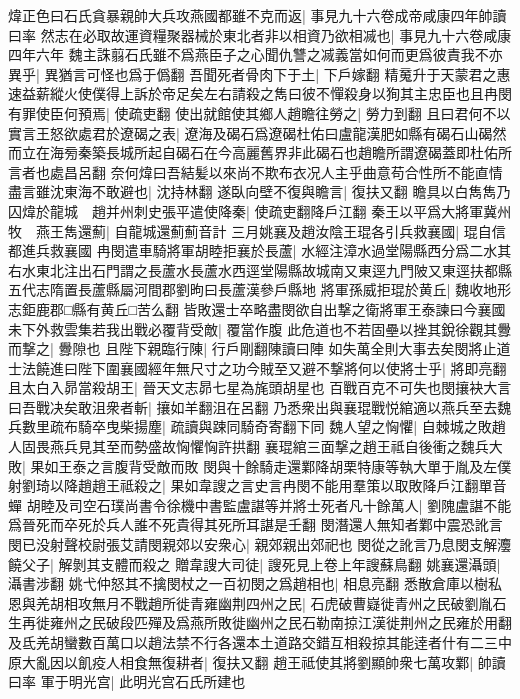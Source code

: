 煒正色曰石氏貪暴親帥大兵攻燕國都雖不克而返|{
	事見九十六卷成帝咸康四年帥讀曰率}
然志在必取故運資糧聚器械於東北者非以相資乃欲相㓕也|{
	事見九十六卷咸康四年六年}
魏主誅翦石氏雖不爲燕臣子之心聞仇讐之㓕義當如何而更爲彼責我不亦異乎|{
	異猶言可怪也爲于僞翻}
吾聞死者骨肉下于土|{
	下戶嫁翻}
精䰟升于天蒙君之惠速益薪縱火使僕得上訴於帝足矣左右請殺之雋曰彼不憚殺身以狥其主忠臣也且冉閔有罪使臣何預焉|{
	使疏吏翻}
使出就館使其鄉人趙瞻往勞之|{
	勞力到翻}
且曰君何不以實言王怒欲處君於遼碣之表|{
	遼海及碣石爲遼碣杜佑曰盧龍漢肥如縣有碣石山碣然而立在海㫄秦築長城所起自碣石在今高麗舊界非此碣石也趙瞻所謂遼碣蓋即杜佑所言者也處昌呂翻}
奈何煒曰吾結髪以來尚不欺布衣况人主乎曲意苟合性所不能直情盡言雖沈東海不敢避也|{
	沈持林翻}
遂臥向壁不復與瞻言|{
	復扶又翻}
瞻具以白雋雋乃囚煒於龍城　趙并州刺史張平遣使降秦|{
	使疏吏翻降戶江翻}
秦王以平爲大將軍冀州牧　燕王雋還薊|{
	自龍城還薊薊音計}
三月姚襄及趙汝陰王琨各引兵救襄國|{
	琨自信都進兵救襄國}
冉閔遣車騎將軍胡睦拒襄於長蘆|{
	水經注漳水過堂陽縣西分爲二水其右水東北注出石門謂之長蘆水長蘆水西逕堂陽縣故城南又東逕九門陂又東逕扶都縣五代志隋置長蘆縣屬河間郡劉昫曰長蘆漢參戶縣地}
將軍孫威拒琨於黄丘|{
	魏收地形志鉅鹿郡□縣有黄丘□苦么翻}
皆敗還士卒略盡閔欲自出撃之衛將軍王泰諫曰今襄國未下外救雲集若我出戰必覆背受敵|{
	覆當作腹}
此危道也不若固壘以挫其銳徐觀其釁而撃之|{
	釁隙也}
且陛下親臨行陳|{
	行戶剛翻陳讀曰陣}
如失萬全則大事去矣閔將止道士法饒進曰陛下圍襄國經年無尺寸之功今賊至又避不撃將何以使將士乎|{
	將即亮翻}
且太白入昴當殺胡王|{
	晉天文志昴七星為旄頭胡星也}
百戰百克不可失也閔攘袂大言曰吾戰决矣敢沮衆者斬|{
	攘如羊翻沮在呂翻}
乃悉衆出與襄琨戰悦綰適以燕兵至去魏兵數里疏布騎卒曳柴揚塵|{
	疏讀與踈同騎奇寄翻下同}
魏人望之恟懼|{
	自棘城之敗趙人固畏燕兵見其至而勢盛故恟懼恟許拱翻}
襄琨綰三面撃之趙王祗自後衝之魏兵大敗|{
	果如王泰之言腹背受敵而敗}
閔與十餘騎走還鄴降胡栗特康等執大單于胤及左僕射劉琦以降趙趙王祗殺之|{
	果如韋謏之言史言冉閔不能用羣策以取敗降戶江翻單音蟬}
胡睦及司空石璞尚書令徐機中書監盧諶等并將士死者凡十餘萬人|{
	劉隗盧諶不能爲晉死而卒死於兵人誰不死貴得其死所耳諶是壬翻}
閔潛還人無知者鄴中震恐訛言閔已没射聲校尉張艾請閔親郊以安衆心|{
	親郊親出郊祀也}
閔從之訛言乃息閔支解灋饒父子|{
	解剝其支體而殺之}
贈韋謏大司徒|{
	謏死見上卷上年謏蘇鳥翻}
姚襄還灄頭|{
	灄書涉翻}
姚弋仲怒其不擒閔杖之一百初閔之爲趙相也|{
	相息亮翻}
悉散倉庫以樹私恩與羌胡相攻無月不戰趙所徙青雍幽荆四州之民|{
	石虎破曹嶷徙青州之民破劉胤石生再徙雍州之民破段匹殫及爲燕所敗徙幽州之民石勒南掠江漢徙荆州之民雍於用翻}
及氐羌胡蠻數百萬口以趙法禁不行各還本土道路交錯互相殺掠其能逹者什有二三中原大亂因以飢疫人相食無復耕者|{
	復扶又翻}
趙王祗使其將劉顯帥衆七萬攻鄴|{
	帥讀曰率}
軍于明光宫|{
	此明光宫石氏所建也}
